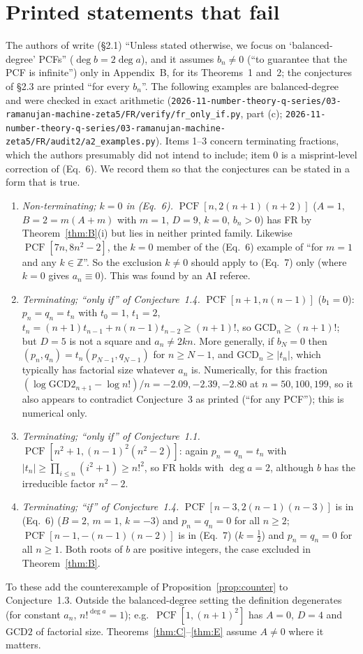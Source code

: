 \documentclass[11pt]{amsart}
\theoremstyle{definition}
\theoremstyle{remark}
\numberwithin{equation}{section}
\newcommand{\PCF}{\operatorname{PCF}}
\newcommand{\Z}{\mathbb{Z}}
\newcommand{\GCD}{\mathrm{GCD}}
\newcommand{\file}[1]{\nolinkurl{2026-11-number-theory-q-series/03-ramanujan-machine-zeta5/#1}}
\begin{document}
\section{Printed statements that fail}\label{sec:printed}

The authors of \cite{BDNM} write (\S2.1) ``Unless stated otherwise, we focus on `balanced-degree' PCFs'' ($\deg b=2\deg a$), and it assumes $b_n\neq0$ (``to guarantee that the PCF is infinite'') only in Appendix~B, for its Theorems~1 and~2; the conjectures of \S2.3 are printed ``for every $b_n$''. The following examples are balanced-degree and were checked in exact arithmetic (\file{FR/verify/fr_only_if.py}, part (c); \file{FR/audit2/a2_examples.py}). Items 1--3 concern terminating fractions, which the authors presumably did not intend to include; item 0 is a misprint-level correction of (Eq.~6). We record them so that the conjectures can be stated in a form that is true.

\begin{enumerate}[label=\arabic*., start=0, leftmargin=1.5em]
\item \emph{Non-terminating; $k=0$ in (Eq.~6).} $\PCF[n,2(n+1)(n+2)]$ ($A=1$, $B=2=m(A+m)$ with $m=1$, $D=9$, $k=0$, $b_n>0$) has FR by Theorem~\ref{thm:B}(i) but lies in neither printed family. Likewise $\PCF[7n,8n^2-2]$, the $k=0$ member of the (Eq.~6) example of \cite{BDNM} ``for $m=1$ and any $k\in\Z$''. So the exclusion $k\neq0$ should apply to (Eq.~7) only (where $k=0$ gives $a_n\equiv0$). This was found by an AI referee.
\item \emph{Terminating; ``only if'' of Conjecture~1.4.} $\PCF[n+1,n(n-1)]$ ($b_1=0$): $p_n=q_n=t_n$ with $t_0=1$, $t_1=2$, $t_n=(n+1)t_{n-1}+n(n-1)t_{n-2}\ge(n+1)!$, so $\GCD_n\ge(n+1)!$; but $D=5$ is not a square and $a_n\neq2kn$. More generally, if $b_N=0$ then $(p_n,q_n)=t_n(p_{N-1},q_{N-1})$ for $n\ge N-1$, and $\GCD_n\ge|t_n|$, which typically has factorial size whatever $a_n$ is. Numerically, for this fraction $(\log\GCD2_{n+1}-\log n!)/n=-2.09,-2.39,-2.80$ at $n=50,100,199$, so it also appears to contradict Conjecture~3 as printed (``for any PCF''); this is numerical only.
\item \emph{Terminating; ``only if'' of Conjecture~1.1.} $\PCF[n^2+1,(n-1)^2(n^2-2)]$: again $p_n=q_n=t_n$ with $|t_n|\ge\prod_{i\le n}(i^2+1)\ge n!^2$, so FR holds with $\deg a=2$, although $b$ has the irreducible factor $n^2-2$.
\item \emph{Terminating; ``if'' of Conjecture~1.4.} $\PCF[n-3,2(n-1)(n-3)]$ is in (Eq.~6) ($B=2$, $m=1$, $k=-3$) and $p_n=q_n=0$ for all $n\ge2$; $\PCF[n-1,-(n-1)(n-2)]$ is in (Eq.~7) ($k=\frac12$) and $p_n=q_n=0$ for all $n\ge1$. Both roots of $b$ are positive integers, the case excluded in Theorem~\ref{thm:B}.
\end{enumerate}
To these add the counterexample of Proposition~\ref{prop:counter} to Conjecture~1.3. Outside the balanced-degree setting the definition degenerates (for constant $a_n$, $n!^{\deg a}=1$); e.g.\ $\PCF[1,(n+1)^2]$ has $A=0$, $D=4$ and $\GCD2$ of factorial size. Theorems~\ref{thm:C}--\ref{thm:E} assume $A\neq0$ where it matters.
\end{document}
